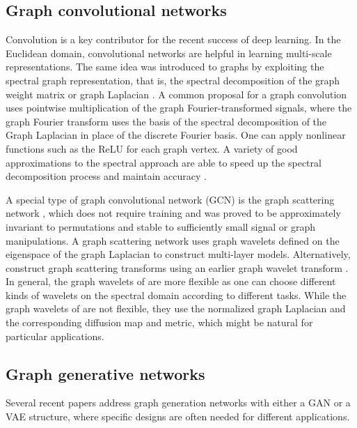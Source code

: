 \documentclass[conference]{IEEEtran}
\begin{document}
\subsection{Graph convolutional networks}
\label{sec:GCN}
Convolution is a key contributor for the recent success of deep learning. In the Euclidean domain, convolutional networks are helpful in learning multi-scale representations. The same idea was introduced to graphs by exploiting the spectral graph representation, that is, the spectral decomposition of the graph weight matrix or graph Laplacian \cite{bruna2013spectral, henaff2015deep}.  A common proposal for a graph convolution uses pointwise multiplication of the graph Fourier-transformed signals, where the graph Fourier transform uses the basis of the spectral decomposition of the Graph Laplacian in place of the discrete Fourier basis. One can apply nonlinear functions such as the ReLU for each graph vertex.
A variety of good approximations to the spectral approach are able to speed up the spectral decomposition process and maintain accuracy \cite{defferrard2016convolutional, kipf2016semi}.

A special type of graph convolutional network (GCN) is the graph scattering network \cite{zou2018graph}, which does not require training and was proved to be approximately invariant to permutations and stable to sufficiently small signal or graph manipulations. A graph scattering network uses graph wavelets \cite{hammond2011wavelets} defined on the eigenspace of the graph Laplacian to construct multi-layer models. Alternatively, \cite{gama2018diffusion} construct graph scattering transforms using an earlier graph wavelet transform \cite{coifman2006diffusion}. In general, the graph wavelets of \cite{hammond2011wavelets} are more flexible as one can choose different kinds of wavelets on the spectral domain according to different tasks. While the graph wavelets of \cite{coifman2006diffusion} are not flexible, they use the normalized graph Laplacian and the corresponding diffusion map and metric, which might be natural for particular applications.



\subsection{Graph generative networks}
\label{sec:graph_gen_net}
Several recent papers address graph generation networks with either a GAN or a VAE structure, where specific designs are often needed for different applications. 
\end{document}
